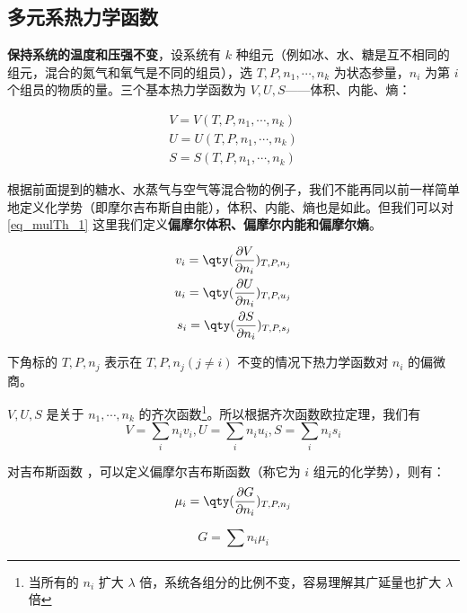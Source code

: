\subsection{多元系热力学函数}

\textbf{保持系统的温度和压强不变}，设系统有 $k$ 种组元（例如冰、水、糖是互不相同的组元，混合的氮气和氧气是不同的组员），选 $T,P,n_1,\cdots,n_k$ 为状态参量，$n_i$ 为第 $i$ 个组员的物质的量。三个基本热力学函数为 $V,U,S$——体积、内能、熵：

\begin{equation}\label{eq_mulTh_1}
\begin{aligned}
V=V(T,P,n_1,\cdots,n_k)\\
U=U(T,P,n_1,\cdots,n_k)\\
S=S(T,P,n_1,\cdots,n_k)
\end{aligned}
\end{equation}

根据前面提到的糖水、水蒸气与空气等混合物的例子，我们不能再同以前一样简单地定义化学势（即摩尔吉布斯自由能），体积、内能、熵也是如此。但我们可以对\autoref{eq_mulTh_1}  这里我们定义\textbf{偏摩尔体积、偏摩尔内能和偏摩尔熵}。

\begin{equation}
\begin{aligned}
v_i=\qty(\frac{\partial V}{\partial n_i})_{T,P,n_j}\\
u_i=\qty(\frac{\partial U}{\partial n_i})_{T,P,u_j}\\
s_i=\qty(\frac{\partial S}{\partial n_i})_{T,P,s_j}
\end{aligned}
\end{equation}

下角标的 $T,P,n_j$ 表示在 $T,P,n_j(j\neq i)$ 不变的情况下热力学函数对 $n_i$ 的偏微商。

$V,U,S$ 是关于 $n_1,\cdots,n_k$ 的齐次函数\footnote{当所有的 $n_i$ 扩大 $\lambda$ 倍，系统各组分的比例不变，容易理解其广延量也扩大 $\lambda$ 倍}。所以根据齐次函数欧拉定理，我们有
\begin{equation}
V=\sum_i n_iv_i,U=\sum_i n_iu_i,S=\sum_i n_is_i
\end{equation}

对吉布斯函数 ，可以定义偏摩尔吉布斯函数（称它为 $i$ 组元的化学势），则有：
\begin{equation}\label{eq_mulTh_4}
\mu_i=\qty(\frac{\partial G}{\partial n_i})_{T,P,n_j}
\end{equation}

\begin{equation}\label{eq_mulTh_2}
G=\sum n_i \mu_i
\end{equation}

